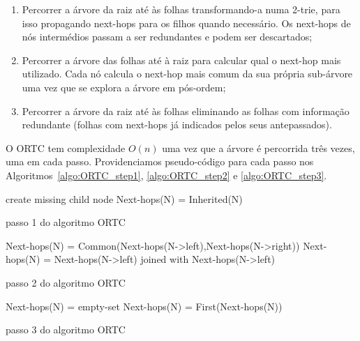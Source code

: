 \documentclass[10pt,a4paper]{article}
\makeatletter
\newcommand{\nosemic}{\renewcommand{\@endalgocfline}{\relax}}	%
\makeatother
\begin{document}
\begin{enumerate}
	\item	Percorrer a árvore da raiz até às folhas transformando-a numa \mbox{2-trie}, para isso propagando next-hops para os filhos quando necessário. Os next-hops de nós intermédios passam a ser redundantes e podem ser descartados;

	\item	Percorrer a árvore das folhas até à raiz para calcular qual o next-hop mais utilizado. Cada nó calcula o next-hop mais comum da sua própria sub-árvore uma vez que se explora a árvore em pós-ordem;

	\item	Percorrer a árvore da raiz até às folhas eliminando as folhas com informação redundante (folhas com next-hops já indicados pelos seus antepassados).

\end{enumerate}
	
	O ORTC tem complexidade $O(n)$ uma vez que a árvore é percorrida três vezes, uma em cada passo. Providenciamos pseudo-código para cada passo nos Algoritmos~\ref{algo:ORTC_step1}, \ref{algo:ORTC_step2} e \ref{algo:ORTC_step3}.
	
\begin{algorithm}
\label{algo:ORTC_step1}
\nosemic
{}
{
	{
		create missing child node \;
	}
	{
		Next-hops(N) = Inherited(N) \;
	}
}
\caption{passo 1 do algoritmo ORTC}
\end{algorithm}

\begin{algorithm}
\label{algo:ORTC_step2}
\nosemic
{}
{
	{
		Next-hops(N) = \;
			\Indp	Common(Next-hops(N->left),Next-hops(N->right)) \;
	}
	\uElse
	{
		Next-hops(N) = \;
			\Indp	Next-hops(N->left) joined with Next-hops(N->left) \;
	}
}
\caption{passo 2 do algoritmo ORTC}
\end{algorithm}

\begin{algorithm}
\label{algo:ORTC_step3}
\nosemic
{}
{
	{
		Next-hops(N) = empty-set \;
	}
	\uElse
	{
		Next-hops(N) = First(Next-hops(N)) \;
	}
}
\caption{passo 3 do algoritmo ORTC}
\end{algorithm}


\end{document}
